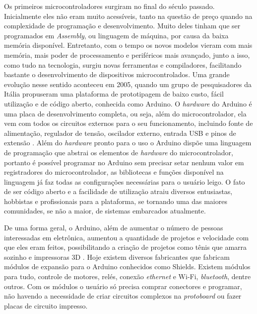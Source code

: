Os primeiros microcontroladores surgiram no final do século passado. Inicialmente eles não eram muito acessíveis, tanto na questão de preço quando na complexidade de programação e desenvolvimento. Muito deles tinham que ser programados em \emph{Assembly}, ou linguagem de máquina, por causa da baixa memória disponível. Entretanto, com o tempo os novos modelos vieram com mais memória, mais poder de processamento e periféricos mais avançado, junto a isso, como tudo na tecnologia, surgiu novas ferramentas e compiladores, facilitando bastante o desenvolvimento de dispositivos microcontrolados. Uma grande evolução nesse sentido aconteceu em 2005, quando um grupo de pesquisadores da Itália propuseram uma plataforma de prototipagem de baixo custo, fácil utilização e de código aberto, conhecida como Arduino. O \emph{hardware} do Arduino é uma placa de desenvolvimento completa, ou seja, além do microcontrolador, ela vem com todos os circuitos externos para o seu funcionamento, incluindo fonte de alimentação, regulador de tensão, oscilador externo, entrada USB e pinos de extensão \cite{tedarduino}. Além do \emph{hardware} pronto para o uso o Arduino dispõe uma linguagem de programação que abstrai os elementos de \emph{hardware} do microcontrolador, portanto é possível programar no Arduino sem precisar setar nenhum valor em registradores do microcontrolador, as bibliotecas e funções disponível na linguagem já faz todas as configurações necessárias para o usuário leigo. O fato de ser código aberto e a facilidade de utilização atraiu diversos entusiastas, hobbistas e profissionais para a plataforma, se tornando uma das maiores comunidades, se não a maior, de sistemas embarcados atualmente. 

De uma forma geral, o Arduino, além de aumentar o número de pessoas interessadas em eletrônica, aumentou a quantidade de projetos e velocidade com que eles eram feitos, possibilitando a criação de projetos como tênis que amarra sozinho e impressoras 3D \cite{tenissozinho}. Hoje existem diversos fabricantes que fabricam módulos de expansão para o Arduino conhecidos como Shields. Existem módulos para tudo, controle de motores, relés, conexão \emph{ethernet} e Wi-Fi, \emph{bluetooth}, dentre outros. Com os módulos o usuário só precisa comprar conectores e programar, não havendo a necessidade de criar circuitos complexos na \emph{protoboard} ou fazer placas de circuito impresso.

